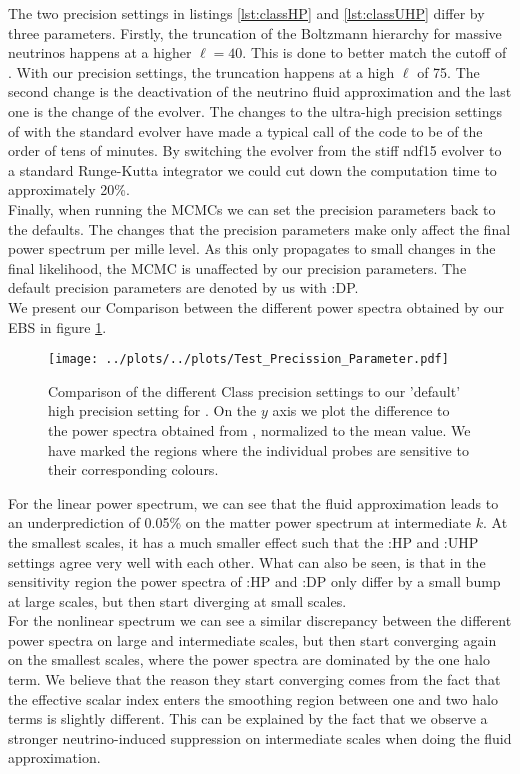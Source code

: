 \documentclass[../main.tex]{subfiles}
\begin{document}
 The two precision settings in listings \ref{lst:classHP} and \ref{lst:classUHP} differ by three parameters. Firstly, the truncation of the Boltzmann hierarchy for massive neutrinos happens at a higher $\ell=40$. This is done to better match the cutoff of \camb. With our precision settings, the truncation happens at a high $\ell$ of 75. The second change is the deactivation of the neutrino fluid approximation and the last one is the change of the evolver. The changes to the ultra-high precision settings of \class with the standard evolver have made a typical call of the code to be of the order of tens of minutes. By switching the evolver from the stiff ndf15 evolver to a standard Runge-Kutta integrator we could cut down the computation time to approximately 20\%.\\
 Finally, when running the MCMCs we can set the precision parameters back to the \class defaults. The changes that the precision parameters make only affect the final power spectrum per mille level. As this only propagates to small changes in the final likelihood, the MCMC is unaffected by our precision parameters. The default precision parameters are denoted by us with \class:DP.\\
 We present our Comparison between the different power spectra obtained by our EBS in figure \ref{fig:precisson_settings}.
 \begin{figure}
    \centering
    \texttt{[image: ../plots/../plots/Test\_Precission\_Parameter.pdf]}
    \caption{Comparison of the different Class precision settings to our 'default' high precision setting for \camb. On the $y$ axis we plot the difference to the power spectra obtained from \camb, normalized to the mean value. We have marked the regions where the individual probes are sensitive to their corresponding colours.}
    \label{fig:precisson_settings}
 \end{figure}  
 For the linear power spectrum, we can see that the fluid approximation leads to an underprediction of 0.05\% on the matter power spectrum at intermediate $k$. At the smallest scales, it has a much smaller effect such that the \class:HP and \class:UHP settings agree very well with each other. What can also be seen, is that in the sensitivity region the power spectra of \class:HP and \class:DP only differ by a small bump at large scales, but then start diverging at small scales.\\
 For the nonlinear spectrum we can see a similar discrepancy between the different power spectra on large and intermediate scales, but then start converging again on the smallest scales, where the power spectra are dominated by the one halo term. We believe that the reason they start converging comes from the fact that the effective scalar index enters the smoothing region between one and two halo terms is slightly different. This can be explained by the fact that we observe a stronger neutrino-induced suppression on intermediate scales when doing the fluid approximation.\\
\end{document}
